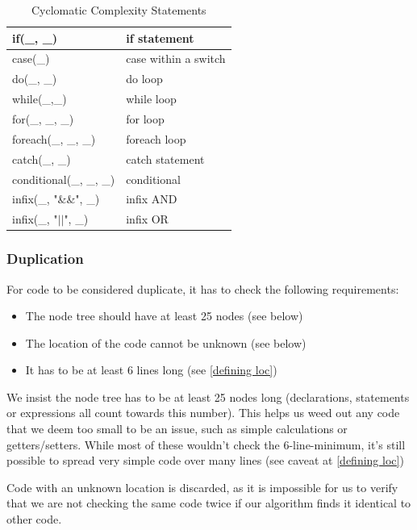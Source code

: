 \documentclass{article}
\begin{document}
\begin{table}[h!tbp]
	\caption{Cyclomatic Complexity Statements}
	\label{complexityvalues}
	\begin{tabular}{l|l}	
		\hline
		if(\_, \_)					&			if statement \\
		\hline
		case(\_)					&			case within a switch \\
		\hline
		do(\_, \_)					&			do loop \\
		\hline
		while(\_,\_)				&			while loop \\
		\hline
		for(\_, \_, \_)				&			for loop \\
		\hline
		foreach(\_, \_, \_)			&			foreach loop \\
		\hline
		catch(\_, \_)				&			catch statement \\
		\hline
		conditional(\_, \_, \_)		&			conditional \\
		\hline
		infix(\_, "\&\&", \_)		&			infix AND \\
		\hline
		infix(\_, "\(||\)", \_)		&			infix OR \\
		\hline
	\end{tabular}
\end{table}

\subsubsection{Duplication} \label{dupereqs}
For code to be considered duplicate, it has to check the following requirements:
\begin{itemize}
\item The node tree should have at least 25 nodes (see below)
\item The location of the code cannot be unknown (see below)
\item It has to be at least 6 lines long (see \ref{defining loc})
\end{itemize}

We insist the node tree has to be at least 25 nodes long (declarations, statements or expressions all count towards this number). This helps us weed out any code that we deem too small to be an issue, such as simple calculations or getters/setters. While most of these wouldn't check the 6-line-minimum, it's still possible to spread very simple code over many lines (see caveat at \ref{defining loc})

Code with an unknown location is discarded, as it is impossible for us to verify that we are not checking the same code twice if our algorithm finds it identical to other code.
\end{document}
